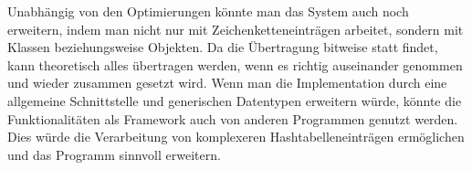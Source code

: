 \documentclass{scrreprt}
\begin{document}
Unabhängig von den Optimierungen könnte man das System auch noch erweitern, indem man nicht nur mit Zeichenketteneinträgen arbeitet, sondern mit Klassen beziehungsweise Objekten. Da die Übertragung bitweise statt findet, kann theoretisch alles übertragen werden, wenn es richtig auseinander genommen und wieder zusammen gesetzt wird. Wenn man die Implementation durch eine allgemeine Schnittstelle und generischen Datentypen erweitern würde, könnte die Funktionalitäten als Framework auch von anderen Programmen genutzt werden. Dies würde die Verarbeitung von komplexeren Hashtabelleneinträgen ermöglichen und das Programm sinnvoll erweitern.

\nocite{*}
\printbibliography

\listoffigures
 
\listoftables
\end{document}
